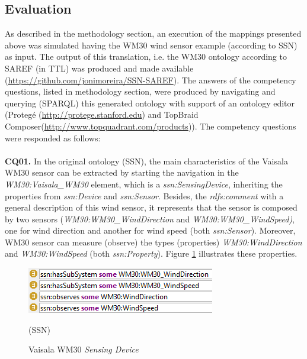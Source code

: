 \documentclass{sig-alternate-05-2015}
\begin{document}
\subsection{Evaluation}
As described in the methodology section, an execution of the mappings presented above was simulated having the WM30 wind sensor example (according to SSN) as input. The output of this translation, i.e. the WM30 ontology according to SAREF (in TTL) was produced and made available (\url{https://github.com/jonimoreira/SSN-SAREF}). The answers of the competency questions, listed in methodology section, were produced by navigating and querying (SPARQL) this generated ontology with support of an ontology editor (Protegé (\url{http://protege.stanford.edu}) and TopBraid Composer(\url{http://www.topquadrant.com/products})). The competency questions were responded as follows:
\\\\\textbf{CQ01.} In the original ontology (SSN), the main characteristics of the Vaisala WM30 sensor can be extracted by starting the navigation in the \textit{WM30:\-Vaisala\-\_WM30} element, which is a \textit{ssn:\-SensingDevice}, inheriting the properties from \textit{ssn:\-Device} and \textit{ssn:\-Sensor}. Besides, the \textit{rdfs:comment} with a general description of this wind sensor, it represents that the sensor is composed by two sensors (\textit{WM30:\-WM30\-\_Wind\-Direction} and \textit{WM30:\-WM30\-\_WindSpeed)}, one for wind direction and another for wind speed (both \textit{ssn:\-Sensor}). Moreover, WM30 sensor can measure (observe) the types (properties) \textit{WM30:\-WindDirection} and \textit{WM30:\-WindSpeed} (both \textit{ssn:\-Property}). Figure \ref{fig:SSN_SystemProperties} illustrates these properties.

\begin{figure}[h!]
\centering
\includegraphics[scale=0.98]{SSN_SystemProperties}
\caption{Vaisala WM30 \textit{Sensing Device}} (SSN)
\label{fig:SSN_SystemProperties}
\end{figure}
\end{document}
